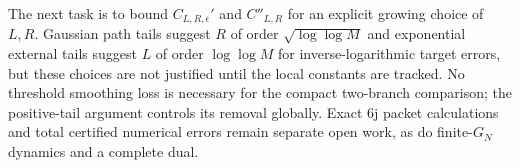 The next task is to bound $C_{L,R,\epsilon}'$ and $C''_{L,R}$ for an
explicit growing choice of $L,R$. Gaussian path tails suggest
$R$ of order $\sqrt{\log\log M}$ and exponential external tails suggest
$L$ of order $\log\log M$ for inverse-logarithmic target errors, but
these choices are not justified until the local constants are tracked.
No threshold smoothing loss is necessary for the compact two-branch
comparison; the positive-tail argument controls its removal globally.
Exact 6j packet calculations and total certified numerical errors remain
separate open work, as do finite-$G_N$ dynamics and a complete dual.

